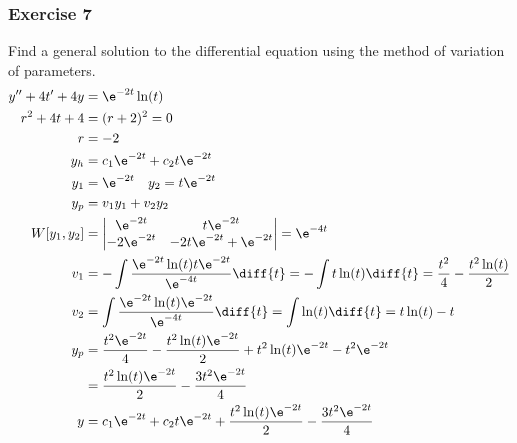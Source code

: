 \documentclass{math}
\begin{document}
\subsubsection*{Exercise 7}
Find a general solution to the differential equation using the method of
variation of parameters.
\begin{align*}
  y''+4t'+4y &= \e^{-2t}\ln(t) \\
  r^2+4t+4 &= (r+2)^2 = 0 \\
  r &= -2 \\
  y_h &= c_1\e^{-2t}+c_2t\e^{-2t} \\
  y_1 &= \e^{-2t} \quad y_2 = t\e^{-2t} \\
  y_p &= v_1y_1+v_2y_2 \\
  W[y_1,y_2] &= \begin{vmatrix}
    \e^{-2t} & t\e^{-2t} \\
    -2\e^{-2t} & -2t\e^{-2t}+\e^{-2t}
  \end{vmatrix} = \e^{-4t} \\
  v_1 &= -\int\frac{\e^{-2t}\ln(t)t\e^{-2t}}{\e^{-4t}}\diff{t} =
    -\int t\ln(t)\diff{t} = \frac{t^2}{4}-\frac{t^2\ln(t)}{2} \\
  v_2 &= \int\frac{\e^{-2t}\ln(t)\e^{-2t}}{\e^{-4t}}\diff{t} =
    \int\ln(t)\diff{t} = t\ln(t)-t \\
  y_p &= \frac{t^2\e^{-2t}}{4}-\frac{t^2\ln(t)\e^{-2t}}{2}+
    t^2\ln(t)\e^{-2t}-t^2\e^{-2t} \\
  &= \frac{t^2\ln(t)\e^{-2t}}{2}-\frac{3t^2\e^{-2t}}{4} \\
  y &= c_1\e^{-2t}+c_2t\e^{-2t}+
    \frac{t^2\ln(t)\e^{-2t}}{2}-\frac{3t^2\e^{-2t}}{4}
\end{align*}
\end{document}
